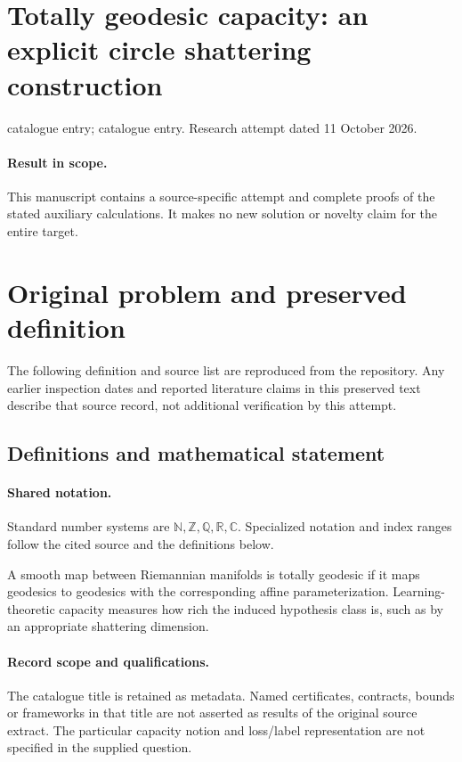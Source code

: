 \documentclass[11pt]{article}
\begin{document}
\section*{Totally geodesic capacity: an explicit circle shattering construction}
\noindent catalogue entry; catalogue entry. Research attempt dated 11 October 2026.
\paragraph{Result in scope.}This manuscript contains a source-specific attempt and complete proofs of the stated auxiliary calculations. It makes no new solution or novelty claim for the entire target.
\section{Original problem and preserved definition}
The following definition and source list are reproduced from the repository. Any earlier inspection dates and reported literature claims in this preserved text describe that source record, not additional verification by this attempt.
\subsection{Definitions and mathematical statement}

\paragraph{Shared notation.}Standard number systems are $\mathbb N,\mathbb Z,\mathbb Q,\mathbb R,\mathbb C$. Specialized notation and index ranges follow the cited source and the definitions below.


A smooth map between Riemannian manifolds is totally geodesic if it maps geodesics to geodesics with the corresponding affine parameterization. Learning-theoretic capacity measures how rich the induced hypothesis class is, such as by an appropriate shattering dimension.
\paragraph{Record scope and qualifications.}
The catalogue title is retained as metadata. Named certificates, contracts, bounds or frameworks in that title are not asserted as results of the original source extract.
The particular capacity notion and loss/label representation are not specified in the supplied question.
\end{document}
